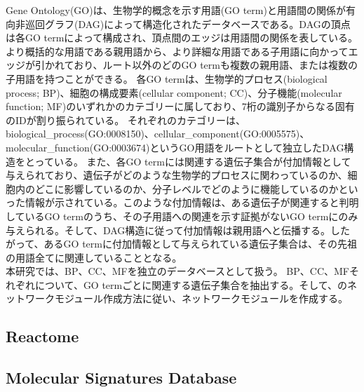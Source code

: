 \documentclass[a4paper,12pt]{jsreport}
\begin{document}
Gene Ontology(GO)は、生物学的概念を示す用語(GO term)と用語間の関係が有向非巡回グラフ(DAG)によって構造化されたデータベースである。DAGの頂点は各GO termによって構成され、頂点間のエッジは用語間の関係を表している。より概括的な用語である親用語から、より詳細な用語である子用語に向かってエッジが引かれており、ルート以外のどのGO termも複数の親用語、または複数の子用語を持つことができる。
各GO termは、生物学的プロセス(biological process; BP)、細胞の構成要素(cellular component; CC)、分子機能(molecular function; MF)のいずれかのカテゴリーに属しており、7桁の識別子からなる固有のIDが割り振られている。
それぞれのカテゴリーは、biological\_process(GO:0008150)、cellular\_component(GO:0005575)、molecular\_function(GO:0003674)というGO用語をルートとして独立したDAG構造をとっている。
また、各GO termには関連する遺伝子集合が付加情報として与えられており、遺伝子がどのような生物学的プロセスに関わっているのか、細胞内のどこに影響しているのか、分子レベルでどのように機能しているのかといった情報が示されている。このような付加情報は、ある遺伝子が関連すると判明しているGO termのうち、その子用語への関連を示す証拠がないGO termにのみ与えられる。そして、DAG構造に従って付加情報は親用語へと伝播する。したがって、あるGO termに付加情報として与えられている遺伝子集合は、その先祖の用語全てに関連していることとなる。\\
本研究では、BP、CC、MFを独立のデータベースとして扱う。 BP、CC、MFそれぞれについて、GO termごとに関連する遺伝子集合を抽出する。そして、のネットワークモジュール作成方法に従い、ネットワークモジュールを作成する。



\subsection{Reactome}
\begin{comment}
\#\#\#\#\#\#\#\#\#\#\# \\
・reactome説明\\
パスウェイと親子関係があるDAG構造を取ること\\
ルートがいくつかあること\\
アノテーション情報があること\\
子用語のアノテーションは親用語のアノテーションになること\\
遺伝子集合と親子関係を抽出すること\\
\#\#\#\#\#\#\#\#\#\#\# \\
\end{comment}

\subsection{Molecular Signatures Database}
\begin{comment}
\#\#\#\#\#\#\#\#\#\#\# \\
・MSigDB説明\\
いくつかの要素で遺伝子集合があること\\
その中から使うもの\\
遺伝子集合を抽出すること\\
\#\#\#\#\#\#\#\#\#\#\# \\
\end{comment}
\end{document}
